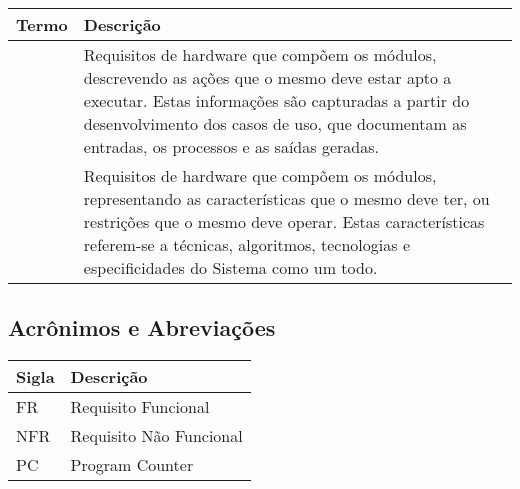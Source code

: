 \documentclass{article}
\begin{document}
	  \FloatBarrier
	  \begin{table}[H]
	    \begin{center}
	      \begin{tabular}[pos]{|m{2.5cm} | m{11.5cm}|} 
	        \hline
	        \cellcolor[gray]{0.9}\textbf{Termo} & \cellcolor[gray]{0.9}\textbf{Descrição} \\ \hline
	        \flushright \centering {Requisito Funcional} & Requisitos de hardware que compõem os módulos, descrevendo as ações que o 
	                                    mesmo deve estar apto a executar. Estas informações são capturadas a partir 
	                                    do desenvolvimento dos casos de uso, que documentam as entradas, os processos 
	                                    e as saídas geradas.  \\ \hline
	        \flushright \centering {Requisito Não \mbox{Funcional}} & Requisitos de hardware que compõem os módulos, representando as características 
	                                    que o mesmo deve ter, ou restrições que o mesmo deve operar. Estas características
	                                    referem-se a técnicas, algoritmos, tecnologias e especificidades do Sistema como um todo.  \\ \hline
	      \end{tabular}
	    \end{center}
	  \end{table}  
	
	  \subsection{Acrônimos e Abreviações}
	    \FloatBarrier
	    \begin{table}[H]
	      \begin{center}
	        \begin{tabular}[pos]{|m{2cm} | m{12cm}|} 
	          \hline
	          \cellcolor[gray]{0.9}\textbf{Sigla} & \cellcolor[gray]{0.9}\textbf{Descrição} \\ \hline
	          FR      & Requisito Funcional  \\ \hline
	          NFR     & Requisito Não Funcional  \\ \hline
			  PC      & Program Counter \\ \hline 
	        \end{tabular}
	      \end{center}
	    \end{table}  
	
\end{document}

